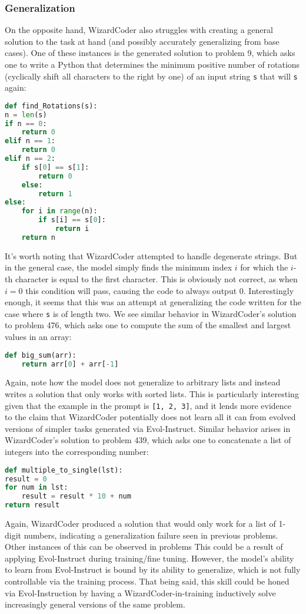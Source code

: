 \documentclass[10pt]{article}
\newcommand{\code}[1]{\texttt{#1}}
\theoremstyle{definition}
\begin{document}
\subsubsection{Generalization}
\noindent On the opposite hand, WizardCoder also struggles with creating a general solution to the task at hand (and possibly accurately generalizing from base cases). One of these instances is the generated solution to problem 9, which asks one to write a Python that determines the minimum positive number of rotations (cyclically shift all characters to the right by one) of an input string \code{s} that will \code{s} again:
\begin{lstlisting}[language=Python]
def find_Rotations(s):
n = len(s)
if n == 0:
    return 0
elif n == 1:
    return 0
elif n == 2:
    if s[0] == s[1]:
        return 0
    else:
        return 1
else:
    for i in range(n):
        if s[i] == s[0]:
            return i
    return n
\end{lstlisting}
\noindent It's worth noting that WizardCoder attempted to handle degenerate strings. But in the general case, the model simply finds the minimum index $i$ for which the $i$-th character is equal to the first character. This is obviously not correct, as when $i=0$ this condition will pass, causing the code to always output 0. Interestingly enough, it seems that this was an attempt at generalizing the code written for the case where \code{s} is of length two. We see similar behavior in WizardCoder's solution to problem 476, which asks one to compute the sum of the smallest and largest values in an array:
\begin{lstlisting}[language=Python]
def big_sum(arr):
    return arr[0] + arr[-1]
\end{lstlisting}
\noindent Again, note how the model does not generalize to arbitrary lists and instead writes a solution that only works with sorted lists. This is particularly interesting given that the example in the prompt is \code{[1, 2, 3]}, and it lends more evidence to the claim that WizardCoder potentially does not learn all it can from evolved versions of simpler tasks generated via Evol-Instruct. Similar behavior arises in WizardCoder's solution to problem 439, which asks one to concatenate a list of integers into the corresponding number:
\begin{lstlisting}[language=Python]
def multiple_to_single(lst):
result = 0
for num in lst:
    result = result * 10 + num
return result
\end{lstlisting}
\noindent Again, WizardCoder produced a solution that would only work for a list of 1-digit numbers, indicating a generalization failure seen in previous problems. Other instances of this can be observed in problems 
\noindent This could be a result of applying Evol-Instruct during training/fine tuning. However, the model's ability to learn from Evol-Instruct is bound by its ability to generalize, which is not fully controllable via the training process. That being said, this skill could be honed via Evol-Instruction by having a WizardCoder-in-training inductively solve increasingly general versions of the same problem.
\end{document}
